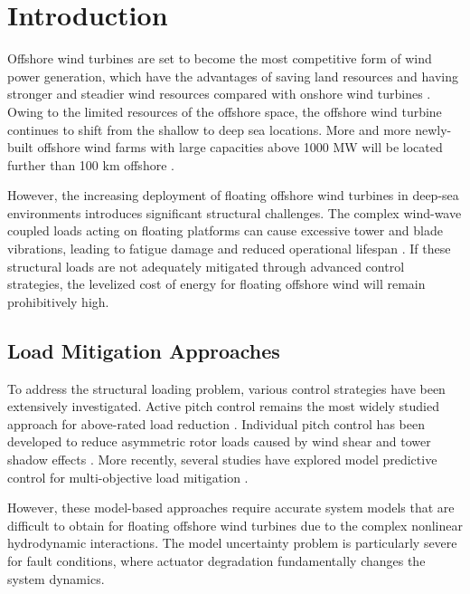 \documentclass{article}
\begin{document}
\section{Introduction}

Offshore wind turbines are set to become the most competitive form of wind power generation, which have the advantages of saving land resources and having stronger and steadier wind resources compared with onshore wind turbines \cite{Zhao2025}. Owing to the limited resources of the offshore space, the offshore wind turbine continues to shift from the shallow to deep sea locations. More and more newly-built offshore wind farms with large capacities above 1000 MW will be located further than 100 km offshore \cite{Zhang2025}.

However, the increasing deployment of floating offshore wind turbines in deep-sea environments introduces significant structural challenges. The complex wind-wave coupled loads acting on floating platforms can cause excessive tower and blade vibrations, leading to fatigue damage and reduced operational lifespan \cite{Chen2023, Li2024}. If these structural loads are not adequately mitigated through advanced control strategies, the levelized cost of energy for floating offshore wind will remain prohibitively high.

\subsection{Load Mitigation Approaches}

To address the structural loading problem, various control strategies have been extensively investigated. Active pitch control remains the most widely studied approach for above-rated load reduction \cite{Bossanyi2003, Larsen2007}. Individual pitch control has been developed to reduce asymmetric rotor loads caused by wind shear and tower shadow effects \cite{Bossanyi2005}. More recently, several studies have explored model predictive control for multi-objective load mitigation \cite{Schlipf2013, Kim2019, Abbas2022}.

However, these model-based approaches require accurate system models that are difficult to obtain for floating offshore wind turbines due to the complex nonlinear hydrodynamic interactions. The model uncertainty problem is particularly severe for fault conditions, where actuator degradation fundamentally changes the system dynamics.
\end{document}
